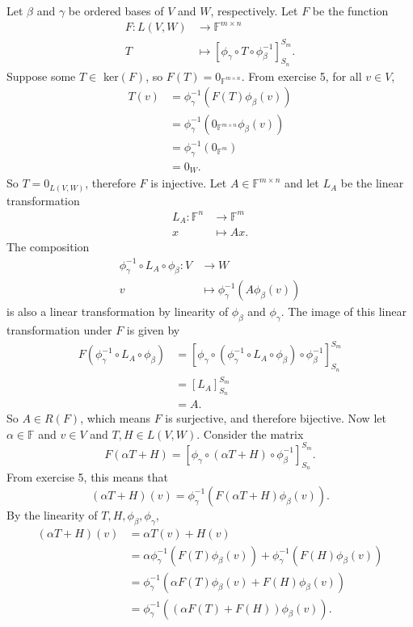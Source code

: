 \documentclass[12pt]{article}
\newcommand{\F}{\mathbb{F}}
\begin{document}
Let $\beta$ and $\gamma$ be ordered bases of $V$ and $W$, respectively. Let $F$ be the function
\begin{align*}
    F: L(V,W)   &\rightarrow \F^{m\times n} \\
            T   &\mapsto \left[\phi_\gamma \circ T \circ \phi_\beta^{-1}\right]_{S_n}^{S_m}.
\end{align*}
Suppose some $T\in$ ker$(F)$, so $F(T) = 0_{\F^{m\times n}}$. From exercise 5, for all $v\in V$,
\begin{align*}
    T(v)    &= \phi_\gamma^{-1}(F(T)\phi_\beta(v)) \\
            &= \phi_\gamma^{-1}(0_{\F^{m\times n}}\phi_\beta(v)) \\
            &= \phi_\gamma^{-1}(0_{\F^m}) \\
            &= 0_W.
\end{align*}
So $T=0_{L(V,W)}$, therefore $F$ is injective. Let $A\in\F^{m\times n}$ and let $L_A$ be the linear transformation
\begin{align*}
    L_A: \F^n   &\rightarrow \F^m \\
            x   &\mapsto Ax.
\end{align*}
The composition
\begin{align*}
    \phi_\gamma^{-1}\circ L_A\circ\phi_\beta: V   &\rightarrow W \\
            v   &\mapsto \phi_\gamma^{-1}(A\phi_\beta(v))
\end{align*}
is also a linear transformation by linearity of $\phi_\beta$ and $\phi_\gamma$. The image of this linear transformation under $F$ is given by
\begin{align*}
    F(\phi_\gamma^{-1}\circ L_A\circ\phi_\beta)
        &= \left[\phi_\gamma \circ (\phi_\gamma^{-1}\circ L_A\circ\phi_\beta) \circ \phi_\beta^{-1}\right]_{S_n}^{S_m} \\
        &= [L_A]_{S_n}^{S_m} \\
        &= A.
\end{align*}
So $A\in R(F)$, which means $F$ is surjective, and therefore bijective. Now let $\alpha\in\F$ and $v\in V$ and $T,H\in L(V,W)$. Consider the matrix
\[F(\alpha T + H) = \left[\phi_\gamma \circ (\alpha T + H) \circ \phi_\beta^{-1}\right]_{S_n}^{S_m}.\]
From exercise 5, this means that
\[(\alpha T + H)(v) = \phi_\gamma^{-1}(F(\alpha T + H)\phi_\beta(v)).\]
By the linearity of $T,H,\phi_\beta,\phi_\gamma$,
\begin{align*}
    (\alpha T + H)(v) 
        &= \alpha T(v) + H(v) \\[1em]
        &= \alpha\phi_\gamma^{-1}(F(T)\phi_\beta(v)) + \phi_\gamma^{-1}(F(H)\phi_\beta(v)) \\[1em]
        &= \phi_\gamma^{-1}(\alpha F(T)\phi_\beta(v) + F(H)\phi_\beta(v))\\[1em]
        &= \phi_\gamma^{-1}((\alpha F(T) + F(H))\phi_\beta(v)).
\end{align*}
\end{document}
